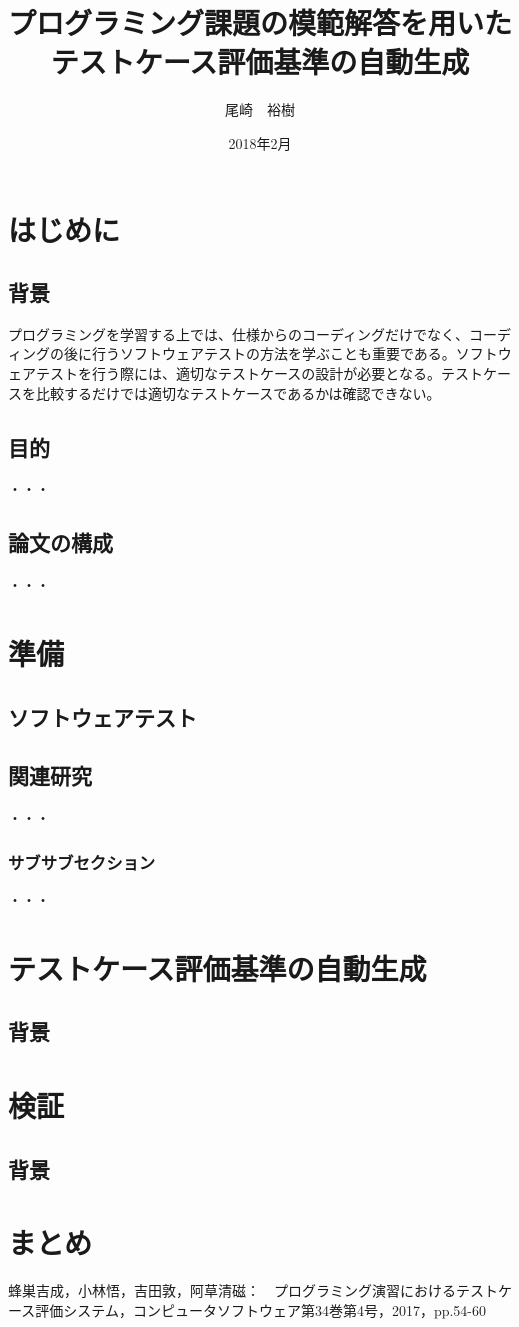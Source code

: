 \documentclass{tpu-sotu}
\author{尾崎　裕樹}
\title{プログラミング課題の模範解答を用いた\\テストケース評価基準の自動生成}
\date{2018年2月}
\begin{document}
%
\maketitle
\clearpage
{}
\tableofcontents
\clearpage
{}
%

%
\chapter{はじめに}
\section{背景}
プログラミングを学習する上では、仕様からのコーディングだけでなく、コーディングの後に行うソフトウェアテストの方法を学ぶことも重要である。ソフトウェアテストを行う際には、適切なテストケースの設計が必要となる。テストケースを比較するだけでは適切なテストケースであるかは確認できない。
\section{目的}
  ・・・
\section{論文の構成}
  ・・・
\chapter{準備}
\section{ソフトウェアテスト}
\section{関連研究}
  ・・・
\subsection{サブサブセクション}
  ・・・
\chapter{テストケース評価基準の自動生成}
\section{背景}
\chapter{検証}
\section{背景}
\chapter{まとめ}
\acknowledgements
\begin{thebibliography}{1}
    蜂巣吉成，小林悟，吉田敦，阿草清磁：　プログラミング演習におけるテストケース評価システム，コンピュータソフトウェア第34巻第4号，2017，pp.54-60
\end{thebibliography}
\end{document}
